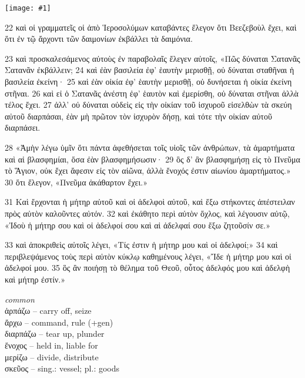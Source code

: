 \documentclass[10pt,a5paper,twoside,twocolumn]{book}
\newcommand{\fig}[1]{\texttt{[image: \#1]}\label{fig:#1}}
\newcommand*\cleartoleftpage{%
  \ifodd\value{page}\hbox{}\clearpage\fi
}
\newcommand{\sceneseparator}{%
  \vspace{-0.7\baselineskip}%
  \hspace{-0.01\textwidth}\noindent\makebox[\linewidth]{\resizebox{0.15\linewidth}{1pt}{$\bullet$}}%
  \vspace{-0.2\baselineskip}
}
\newenvironment{facing}{\cleartoleftpage}{\clearpage\pagebreak}
\newenvironment{help}{\clearpage}{}
\newenvironment{helpsec}{\begin{minipage}[t]{\textwidth}\begin{multicols}{2}}{\end{multicols}\end{minipage}}
\newenvironment{vocab}{\begin{helpsec}}{\end{helpsec}}
\begin{document}

\begin{facing}

\fig{03-22} %

22 καὶ οἱ γραμματεῖς οἱ ἀπὸ Ἱεροσολύμων καταβάντες ἔλεγον ὅτι Βεεζεβοὺλ ἔχει, καὶ ὅτι ἐν τῷ ἄρχοντι τῶν δαιμονίων ἐκβάλλει τὰ δαιμόνια. 

23 καὶ προσκαλεσάμενος αὐτοὺς ἐν παραβολαῖς ἔλεγεν αὐτοῖς, «Πῶς δύναται Σατανᾶς Σατανᾶν ἐκβάλλειν; 24 καὶ ἐὰν βασιλεία ἐφ’ ἑαυτὴν μερισθῇ, οὐ δύναται σταθῆναι ἡ βασιλεία ἐκείνη· 25 καὶ ἐὰν οἰκία ἐφ’ ἑαυτὴν μερισθῇ, οὐ δυνήσεται ἡ οἰκία ἐκείνη στῆναι. 26 καὶ εἰ ὁ Σατανᾶς ἀνέστη ἐφ’ ἑαυτὸν καὶ ἐμερίσθη, οὐ δύναται στῆναι ἀλλὰ τέλος ἔχει. 27 ἀλλ’ οὐ δύναται οὐδεὶς εἰς τὴν οἰκίαν τοῦ ἰσχυροῦ εἰσελθὼν τὰ σκεύη αὐτοῦ διαρπάσαι, ἐὰν μὴ πρῶτον τὸν ἰσχυρὸν δήσῃ, καὶ τότε τὴν οἰκίαν αὐτοῦ διαρπάσει. 

28 «Ἀμὴν λέγω ὑμῖν ὅτι πάντα ἀφεθήσεται τοῖς υἱοῖς τῶν ἀνθρώπων, τὰ ἁμαρτήματα καὶ αἱ βλασφημίαι, ὅσα ἐὰν βλασφημήσωσιν· 29 ὃς δ’ ἂν βλασφημήσῃ εἰς τὸ Πνεῦμα τὸ Ἅγιον, οὐκ ἔχει ἄφεσιν εἰς τὸν αἰῶνα, ἀλλὰ ἔνοχός ἐστιν αἰωνίου ἁμαρτήματος.» 30 ὅτι ἔλεγον, «Πνεῦμα ἀκάθαρτον ἔχει.»

\sceneseparator\vfill

31 Καὶ ἔρχονται ἡ μήτηρ αὐτοῦ καὶ οἱ ἀδελφοὶ αὐτοῦ, καὶ ἔξω στήκοντες ἀπέστειλαν πρὸς αὐτὸν καλοῦντες αὐτόν.
32 καὶ ἐκάθητο περὶ αὐτὸν ὄχλος, καὶ λέγουσιν αὐτῷ, «Ἰδοὺ ἡ μήτηρ σου καὶ οἱ ἀδελφοί σου καὶ αἱ ἀδελφαί σου ἔξω ζητοῦσίν σε.»

33 καὶ ἀποκριθεὶς αὐτοῖς λέγει, «Τίς ἐστιν ἡ μήτηρ μου καὶ οἱ ἀδελφοί;» 34 καὶ περιβλεψάμενος τοὺς περὶ αὐτὸν κύκλῳ καθημένους λέγει,
«Ἴδε ἡ μήτηρ μου καὶ οἱ ἀδελφοί μου. 35 ὃς ἂν ποιήσῃ τὸ θέλημα τοῦ Θεοῦ, οὗτος ἀδελφός μου καὶ ἀδελφὴ καὶ μήτηρ ἐστίν.»


\begin{help}
\begin{vocab}
\emph{common}\\
ἁρπάζω -- carry off, seize\\
ἄρχω -- command, rule (+gen)\\
διαρπάζω -- tear up, plunder\\
ἔνοχος -- held in, liable for\\
μερίζω -- divide, distribute\\
σκεῦος -- sing.: vessel; pl.: goods\\


\end{vocab}
\end{help}
\end{facing}
\end{document}
